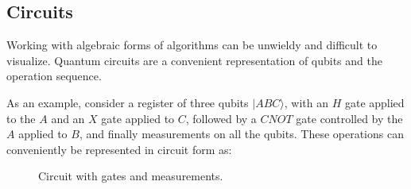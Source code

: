 \documentclass{article}
\begin{document}
%

\subsection{Circuits}

Working with algebraic forms of algorithms can be unwieldy and difficult to visualize. Quantum circuits are a convenient representation of qubits and the operation sequence.





 As an example, consider a register of three qubits $\lvert A B C \rangle $, with an $H$ gate applied to the $A$ and an $X$ gate applied to $C$, followed by a $CNOT$ gate controlled by the $A$ applied to $B$, and finally measurements on all the qubits. These operations can conveniently be represented in circuit form as:



\begin{figure}[h]
\centering
{}

\caption{Circuit with gates and measurements.}
\label{fig:first_circuit}

\end{figure}
\end{document}
